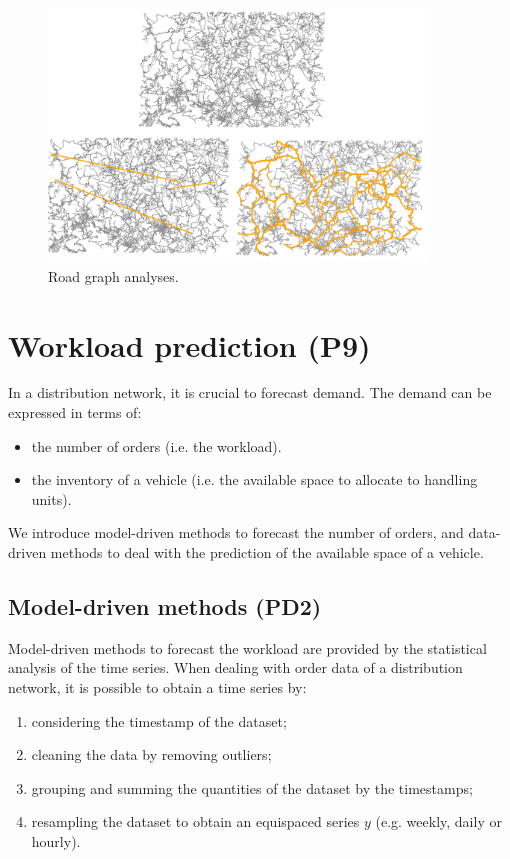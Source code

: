 \begin{figure}[hbt!]
\centering
\includegraphics[width=0.9\textwidth]{SectionDistribution/control_figures/fig_road_graph.png}
\captionsetup{type=figure}
\caption{Road graph analyses.}
\label{fig_road_graph}
\end{figure}





\section{Workload prediction (P9)} \label{secDistWorkloadPrediction}
In a distribution network, it is crucial to forecast demand. The demand can be expressed in terms of:
\begin{itemize}
    \item the number of orders (i.e. the workload).
    \item the inventory of a vehicle (i.e. the available space to allocate to handling units).

\end{itemize}

We introduce model-driven methods to forecast the number of orders, and data-driven methods to deal with the prediction of the available space of a vehicle.

\subsection{Model-driven methods (PD2)}
Model-driven methods to forecast the workload are provided by the statistical analysis of the time series. When dealing with order data of a distribution network, it is possible to obtain a time series by:
\begin{enumerate}
    \item considering the timestamp of the dataset;
	\item cleaning the data by removing outliers;
	\item grouping and summing the quantities of the dataset by the timestamps;
	\item resampling the dataset to obtain an equispaced series $y$ (e.g. weekly, daily or hourly).

\end{enumerate}

